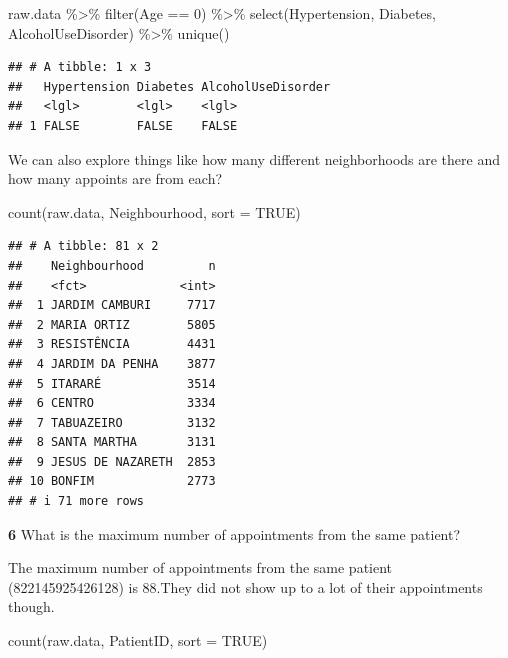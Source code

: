 \documentclass[
]{article}
\newenvironment{Shaded}{\begin{snugshade}}{\end{snugshade}}
\newcommand{\AttributeTok}[1]{\textcolor[rgb]{0.77,0.63,0.00}{#1}}
\newcommand{\ConstantTok}[1]{\textcolor[rgb]{0.00,0.00,0.00}{#1}}
\newcommand{\DecValTok}[1]{\textcolor[rgb]{0.00,0.00,0.81}{#1}}
\newcommand{\FunctionTok}[1]{\textcolor[rgb]{0.00,0.00,0.00}{#1}}
\newcommand{\NormalTok}[1]{#1}
\newcommand{\SpecialCharTok}[1]{\textcolor[rgb]{0.00,0.00,0.00}{#1}}
\begin{document}
\begin{Shaded}
\begin{Highlighting}[]
\NormalTok{raw.data }\SpecialCharTok{\%\textgreater{}\%} \FunctionTok{filter}\NormalTok{(Age }\SpecialCharTok{==} \DecValTok{0}\NormalTok{) }\SpecialCharTok{\%\textgreater{}\%} \FunctionTok{select}\NormalTok{(Hypertension, Diabetes, AlcoholUseDisorder) }\SpecialCharTok{\%\textgreater{}\%} \FunctionTok{unique}\NormalTok{()}
\end{Highlighting}
\end{Shaded}

\begin{verbatim}
## # A tibble: 1 x 3
##   Hypertension Diabetes AlcoholUseDisorder
##   <lgl>        <lgl>    <lgl>             
## 1 FALSE        FALSE    FALSE
\end{verbatim}

We can also explore things like how many different neighborhoods are
there and how many appoints are from each?

\begin{Shaded}
\begin{Highlighting}[]
\FunctionTok{count}\NormalTok{(raw.data, Neighbourhood, }\AttributeTok{sort =} \ConstantTok{TRUE}\NormalTok{)}
\end{Highlighting}
\end{Shaded}

\begin{verbatim}
## # A tibble: 81 x 2
##    Neighbourhood         n
##    <fct>             <int>
##  1 JARDIM CAMBURI     7717
##  2 MARIA ORTIZ        5805
##  3 RESISTÊNCIA        4431
##  4 JARDIM DA PENHA    3877
##  5 ITARARÉ            3514
##  6 CENTRO             3334
##  7 TABUAZEIRO         3132
##  8 SANTA MARTHA       3131
##  9 JESUS DE NAZARETH  2853
## 10 BONFIM             2773
## # i 71 more rows
\end{verbatim}

\textbf{6} What is the maximum number of appointments from the same
patient?

The maximum number of appointments from the same patient
(822145925426128) is 88.They did not show up to a lot of their
appointments though.

\begin{Shaded}
\begin{Highlighting}[]
\FunctionTok{count}\NormalTok{(raw.data, PatientID, }\AttributeTok{sort =} \ConstantTok{TRUE}\NormalTok{)}
\end{Highlighting}
\end{Shaded}
\end{document}
